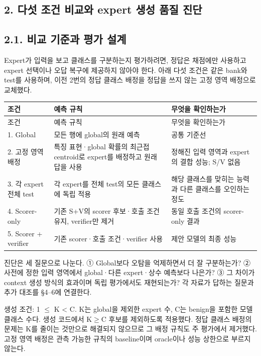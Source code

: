 \subsection*{2. 다섯 조건 비교와 expert 생성 품질 진단}
\subsection*{2.1. 비교 기준과 평가 설계}
Expert가 입력을 보고 클래스를 구분하는지 평가하려면, 정답은 채점에만 사용하고 expert 선택이나 오답 복구에 제공하지 않아야 한다. 아래 다섯 조건은 같은 bank와 test를 사용하며, 이전 2번의 정답 클래스 배정을 정답을 쓰지 않는 고정 영역 배정으로 교체했다.

\begingroup
\footnotesize
\begin{longtable}{>{\raggedright\arraybackslash}p{}>{\raggedright\arraybackslash}p{}>{\raggedright\arraybackslash}p{}}
\toprule
조건 & 예측 규칙 & 무엇을 확인하는가 \\ \midrule
\endfirsthead
조건 & 예측 규칙 & 무엇을 확인하는가 \\ \midrule
\endhead
{}1. Global & 모든 행에 global의 원래 예측 & 공통 기준선 \\
{}2. 고정 영역 배정 & 특징 표현·global 확률의 최근접 centroid로 expert를 배정하고 원래 답을 사용 & 정해진 입력 영역과 expert의 결합 성능; S/\allowbreak{}V 없음 \\
{}3. 각 expert 전체 test & 각 expert를 전체 test의 모든 클래스에 독립 적용 & 해당 클래스를 맞히는 능력과 다른 클래스를 오인하는 정도 \\
{}4. Scorer-only & 기존 S+\allowbreak{}V의 scorer 후보·호출 조건 유지, verifier만 제거 & 동일 호출 조건의 scorer-only 결과 \\
{}5. Scorer +\allowbreak{} verifier & 기존 scorer·호출 조건·verifier 사용 & 제안 모델의 최종 성능 \\
\bottomrule
\end{longtable}
\endgroup
진단은 세 질문으로 나눈다. ① Global보다 오탐을 억제하면서 더 잘 구분하는가? ② 사전에 정한 입력 영역에서 global·다른 expert·상수 예측보다 나은가? ③ 그 차이가 context 생성 방식의 효과이며 독립 평가에서도 재현되는가? 각 자료가 답하는 질문과 추가 대조를 §4–6에 연결한다.

생성 조건: 1 \ensuremath{\leq} K < C. K는 global을 제외한 expert 수, C는 benign을 포함한 모델 클래스 수다. 생성 코드에서 K\ensuremath{\geq}C 후보를 제외하도록 적용했다. 정답 클래스 배정의 문제는 K를 줄이는 것만으로 해결되지 않으므로 그 배정 규칙도 주 평가에서 제거했다. 고정 영역 배정은 관측 가능한 규칙의 baseline이며 oracle이나 성능 상한으로 부르지 않는다.

